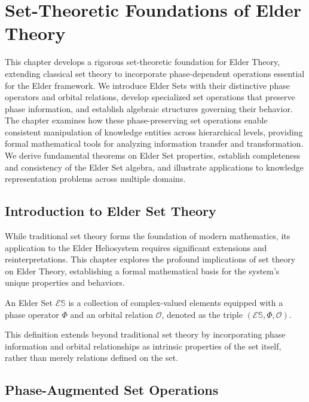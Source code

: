 \chapter{Set-Theoretic Foundations of Elder Theory}

\begin{tcolorbox}[colback=blue!5!white,colframe=blue!75!black,title=Chapter Summary]
This chapter develops a rigorous set-theoretic foundation for Elder Theory, extending classical set theory to incorporate phase-dependent operations essential for the Elder framework. We introduce Elder Sets with their distinctive phase operators and orbital relations, develop specialized set operations that preserve phase information, and establish algebraic structures governing their behavior. The chapter examines how these phase-preserving set operations enable consistent manipulation of knowledge entities across hierarchical levels, providing formal mathematical tools for analyzing information transfer and transformation. We derive fundamental theorems on Elder Set properties, establish completeness and consistency of the Elder Set algebra, and illustrate applications to knowledge representation problems across multiple domains.
\end{tcolorbox}

\section{Introduction to Elder Set Theory}

While traditional set theory forms the foundation of modern mathematics, its application to the Elder Heliosystem requires significant extensions and reinterpretations. This chapter explores the profound implications of set theory on Elder Theory, establishing a formal mathematical basis for the system's unique properties and behaviors.

\begin{definition}
An Elder Set $\mathcal{E}\mathbb{S}$ is a collection of complex-valued elements equipped with a phase operator $\Phi$ and an orbital relation $\mathcal{O}$, denoted as the triple $(\mathcal{E}\mathbb{S}, \Phi, \mathcal{O})$.
\end{definition}

This definition extends beyond traditional set theory by incorporating phase information and orbital relationships as intrinsic properties of the set itself, rather than merely relations defined on the set.

\section{Phase-Augmented Set Operations}

